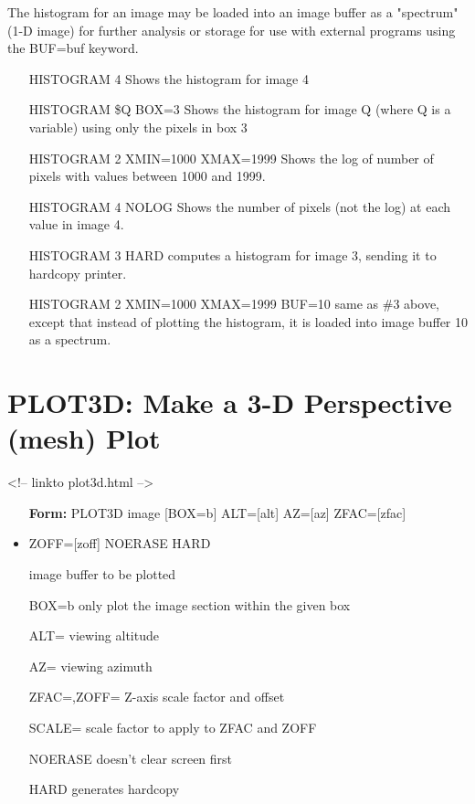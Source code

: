 The histogram for an image may be loaded into an image buffer as a
"spectrum" (1-D image) for further analysis or storage for use with
external programs using the BUF=buf keyword.

\begin{itemize}
  \item[HISTOGRAM 4 \hfill]{Shows the histogram for image 4}
  \item[HISTOGRAM \$Q BOX=3 \hfill]{Shows the histogram for image Q 
       (where Q is a variable) using only the pixels in box 3}
  \item[HISTOGRAM 2 XMIN=1000 XMAX=1999 \hfill]{
       Shows the log of number of pixels with values between 1000 and 1999.}
  \item[HISTOGRAM 4 NOLOG \hfill]{
       Shows the number of pixels (not the log) at each value in image 4.}
  \item[HISTOGRAM 3 HARD\hfill]{
       computes a histogram for image 3, sending it to hardcopy printer.}
  \item[HISTOGRAM 2 XMIN=1000 XMAX=1999 BUF=10\hfill]{ same as \#3 above,
       except that instead of plotting the histogram, it is loaded into image
       buffer 10 as a spectrum.}
\end{itemize}

\section{PLOT3D: Make a 3-D Perspective (mesh) Plot}
\begin{rawhtml}
<!-- linkto plot3d.html -->
\end{rawhtml}
\begin{itemize}
  \item[\textbf{Form: }PLOT3D image {[BOX=b]} ALT={[alt]} AZ={[az]} 
   ZFAC={[zfac]}\hfill]{}
  \item{ZOFF={[zoff]} NOERASE HARD}
  \item[image]{buffer to be plotted}
  \item[BOX=b]{only plot the image section within the given box}
  \item[ALT=]{viewing altitude}
  \item[AZ=]{viewing azimuth}
  \item[ZFAC=,ZOFF=]{Z-axis scale factor and offset}
  \item[SCALE=]{scale factor to apply to ZFAC and ZOFF}
  \item[NOERASE]{doesn't clear screen first}
  \item[HARD]{generates hardcopy}
\end{itemize}

